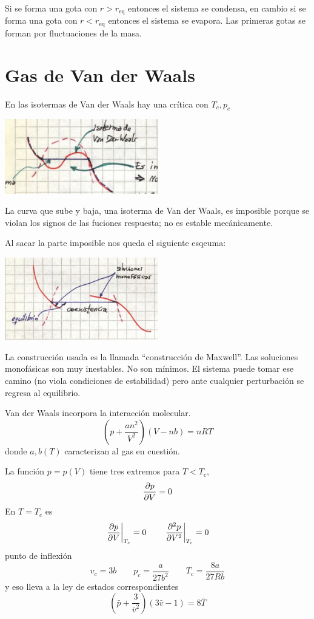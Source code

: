 \documentclass[10pt,oneside]{CBFT_book}
\begin{document}
Si se forma una gota con $r > r_{\text{eq}}$ entonces el sistema se condensa, en cambio si
se forma una gota con $r < r_{\text{eq}}$ entonces el sistema se evapora.
Las primeras gotas se forman por fluctuaciones de la masa.

\section{Gas de Van der Waals}

En las isotermas de Van der Waals hay una crítica con $T_c, p_c$

\includegraphics[width=0.50\textwidth]{images/1606329065.jpg}

La curva que sube y baja, una isoterma de Van der Waals, es imposible porque se violan los signos 
de las fuciones respuesta; no es estable mecánicamente.

Al sacar la parte imposible nos queda el siguiente esqeuma:

\includegraphics[width=0.50\textwidth]{images/1606329069.jpg}

La construcción usada es la llamada ``construcción de Maxwell''. Las soluciones monofásicas son muy
inestables.
No son mínimos. El sistema puede tomar ese camino (no viola condiciones de estabilidad) pero ante
cualquier perturbación se regresa al equilibrio.


Van der Waals incorpora la interacción molecular. 
\[
	\left( p +\frac{an^2}{V^2} \right)(V- nb) = nRT
\]
donde $a,b(T)$ caracterizan al gas en cuestión.

La función $p=p(V)$ tiene tres extremos para $T<T_c$,
\[
	\dpar{p}{V} = 0
\]
En $T=T_c$ es
\[
	\left.\dpar{p}{V} \right|_{T_c} = 0 \qquad \left.\dpar[2]{p}{V} \right|_{T_c} = 0
\]
punto de inflexión
\[
	v_c = 3b \qquad p_c = \frac{a}{27b^2} \qquad T_c = \frac{8a}{27Rb}
\]
y eso lleva a la ley de estados correspondientes
\[
	\left( \bar{p} + \frac{3}{\bar{v}^2} \right)(3 \bar{v} - 1)= 8\bar{T}
\]
\end{document}
